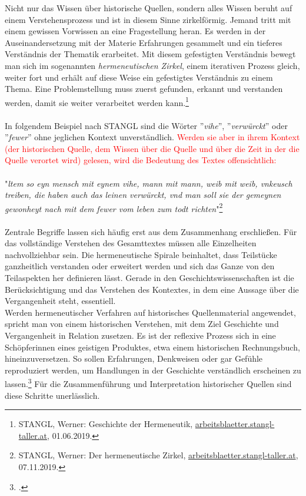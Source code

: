 \documentclass[12pt,a4paper]{article}
\begin{document}
Nicht nur das Wissen über historische Quellen, sondern alles Wissen beruht auf einem Verstehensprozess und ist in diesem Sinne zirkelförmig. Jemand tritt mit einem gewissen Vorwissen an eine Fragestellung heran. Es werden in der Auseinandersetzung mit der Materie Erfahrungen gesammelt und ein tieferes Verständnis der Thematik erarbeitet. Mit diesem gefestigten Verständnis bewegt man sich im sogenannten  \textit{hermeneutischen Zirkel}, einem iterativen Prozess gleich, weiter fort und erhält auf diese Weise ein gefestigtes Verständnis zu einem Thema. Eine Problemstellung muss zuerst gefunden, erkannt und verstanden werden, damit sie weiter verarbeitet werden kann.\footnote{STANGL, Werner: Geschichte der Hermeneutik, \protect\url{arbeitsblaetter.stangl-taller.at}, 01.06.2019.}
\\
\\
In folgendem Beispiel nach STANGL sind die Wörter ''\textit{vihe}'', ''\textit{verwürckt}'' oder ''\textit{fewer}'' ohne jeglichen Kontext unverständlich. \textcolor{red}{Werden sie aber in ihrem Kontext (der historischen Quelle, dem Wissen über die Quelle und über die Zeit in der die Quelle verortet wird) gelesen, wird die Bedeutung des Textes offensichtlich:}
\\
\\
"\textit{ltem so eyn mensch mit eynem vihe, mann mit mann, weib mit weib, vnkeusch treiben, die haben auch das leinen verwürckt, vnd man soll sie der gemeynen gewonheyt nach mit dem fewer vom leben zum todt richten}"\footnote{STANGL, Werner: Der hermeneutische Zirkel, \protect\url{arbeitsblaetter.stangl-taller.at}, 07.11.2019.}
\\
\\
Zentrale Begriffe lassen sich häufig erst aus dem Zusammenhang erschließen. Für das vollständige Verstehen des Gesamttextes müssen alle Einzelheiten nachvollziehbar sein. Die hermeneutische Spirale beinhaltet, dass Teilstücke ganzheitlich verstanden oder erweitert werden und sich das Ganze von den Teilaspekten her definieren lässt. Gerade in den Geschichtswissenschaften ist die Berücksichtigung und das Verstehen des Kontextes, in dem eine Aussage über die Vergangenheit steht, essentiell.
\\
Werden hermeneutischer Verfahren auf historisches Quellenmaterial angewendet, spricht man von einem historischen Verstehen, mit dem Ziel Geschichte und Vergangenheit in Relation zusetzen. Es ist der reflexive Prozess sich in eine Schöpferinnen eines geistigen Produktes, etwa einem historischen Rechnungsbuch, hineinzuversetzen. So sollen Erfahrungen, Denkweisen oder gar Gefühle reproduziert werden, um Handlungen in der Geschichte verständlich erscheinen zu lassen.\footcite[][S.14-20]{detel2011geist} Für die Zusammenführung und Interpretation historischer Quellen sind diese Schritte unerlässlich. 
\end{document}
